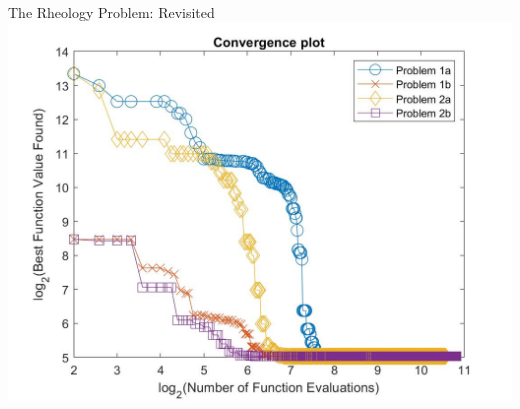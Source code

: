 \documentclass{beamer}
\begin{document}
\begin{frame}{The Rheology Problem: Revisited}
	\centering
	\includegraphics[width=0.85\linewidth]{convergencePlot}
\end{frame}
\end{document}
